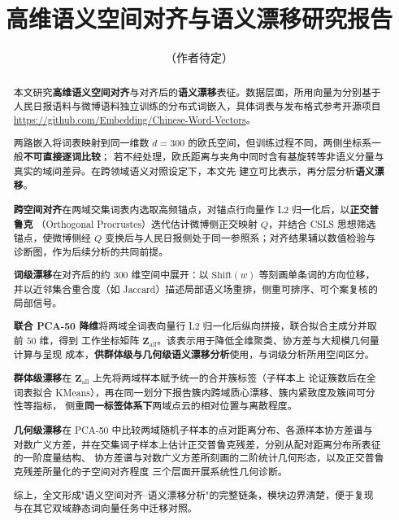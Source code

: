\documentclass[withoutpreface]{cumcmthesis}
\title{高维语义空间对齐与语义漂移研究报告}
\author{（作者待定）}
\date{}
\begin{document}
\setcounter{secnumdepth}{3}
\maketitle

\begin{abstract}

本文研究\textbf{高维语义空间对齐}与对齐后的\textbf{语义漂移}表征。数据层面，所用向量为分别基于
人民日报语料与微博语料独立训练的分布式词嵌入，具体词表与发布格式参考开源项目
\url{https://github.com/Embedding/Chinese-Word-Vectors}。
 

两路嵌入将词表映射到同一维数 $d=300$ 的欧氏空间，但训练过程不同，两侧坐标系一般\textbf{不可直接逐词比较}；
若不经处理，欧氏距离与夹角中同时含有基旋转等非语义分量与真实的域间差异。在跨领域语义对照设定下，本文先
建立可比表示，再分层分析\textbf{语义漂移}。

\textbf{跨空间对齐}在两域交集词表内选取高频锚点，对锚点行向量作 L2 归一化后，以\textbf{正交普鲁克}
（Orthogonal Procrustes）迭代估计微博侧正交映射 $Q$，并结合 CSLS 思想筛选锚点，使微博侧经 $Q$
变换后与人民日报侧处于同一参照系；对齐结果辅以数值检验与诊断图，作为后续分析的共同前提。

\textbf{词级漂移}在对齐后的约 $300$ 维空间中展开：以 $\mathrm{Shift}(w)$ 等刻画单条词的方向位移，
并以近邻集合重合度（如 Jaccard）描述局部语义场重排，侧重可排序、可个案复核的局部信号。

\textbf{联合 PCA-50 降维}将两域全词表向量行 L2 归一化后纵向拼接，联合拟合主成分并取前 $50$ 维，得到
工作坐标矩阵 $\mathbf{Z}_{\mathrm{all}}$。该表示用于降低全维聚类、协方差与大规模几何量计算与呈现
成本，\textbf{供群体级与几何级语义漂移分析}使用，与词级分析所用空间区分。

\textbf{群体级漂移}在 $\mathbf{Z}_{\mathrm{all}}$ 上先将两域样本赋予统一的合并簇标签（子样本上
论证簇数后在全词表拟合 KMeans），再在同一划分下报告簇内跨域质心漂移、簇内紧致度及簇间可分性等指标，
侧重\textbf{同一标签体系下}两域点云的相对位置与离散程度。

\textbf{几何级漂移}在 PCA-50 中比较两域随机子样本的点对距离分布、各源样本协方差谱与
对数广义方差，并在交集词子样本上估计正交普鲁克残差，分别从配对距离分布所表征的一阶度量结构、
协方差谱与对数广义方差所刻画的二阶统计几何形态，以及正交普鲁克残差所量化的子空间对齐程度
三个层面开展系统性几何诊断。

综上，全文形成"语义空间对齐--语义漂移分析"的完整链条，模块边界清楚，便于复现
与在其它双域静态词向量任务中迁移对照。

\end{abstract}
\end{document}
